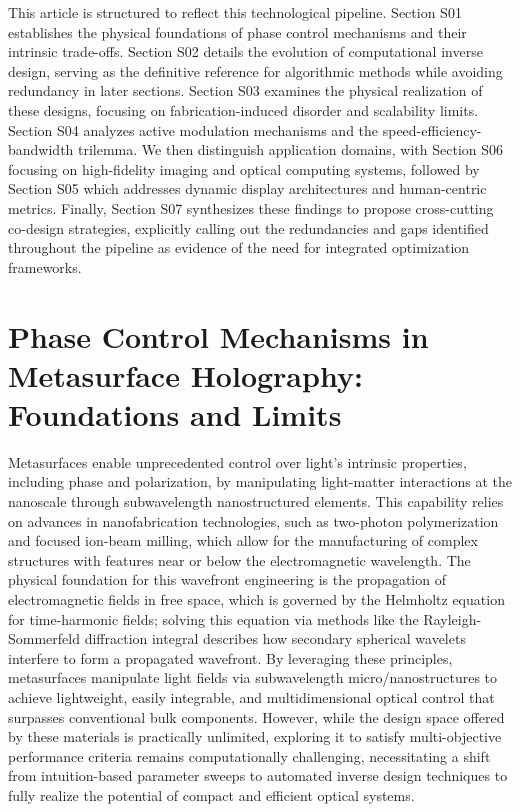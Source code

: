 This article is structured to reflect this technological pipeline. Section S01 establishes the physical foundations of phase control mechanisms and their intrinsic trade-offs. Section S02 details the evolution of computational inverse design, serving as the definitive reference for algorithmic methods while avoiding redundancy in later sections. Section S03 examines the physical realization of these designs, focusing on fabrication-induced disorder and scalability limits. Section S04 analyzes active modulation mechanisms and the speed-efficiency-bandwidth trilemma. We then distinguish application domains, with Section S06 focusing on high-fidelity imaging and optical computing systems, followed by Section S05 which addresses dynamic display architectures and human-centric metrics. Finally, Section S07 synthesizes these findings to propose cross-cutting co-design strategies, explicitly calling out the redundancies and gaps identified throughout the pipeline as evidence of the need for integrated optimization frameworks.

\section{Phase Control Mechanisms in Metasurface Holography: Foundations and Limits}\label{phase-control-mechanisms-in-metasurface-holography-foundations-and-limits}

Metasurfaces enable unprecedented control over light's intrinsic properties, including phase and polarization, by manipulating light-matter interactions at the nanoscale through subwavelength nanostructured elements. This capability relies on advances in nanofabrication technologies, such as two-photon polymerization and focused ion-beam milling, which allow for the manufacturing of complex structures with features near or below the electromagnetic wavelength. The physical foundation for this wavefront engineering is the propagation of electromagnetic fields in free space, which is governed by the Helmholtz equation for time-harmonic fields; solving this equation via methods like the Rayleigh-Sommerfeld diffraction integral describes how secondary spherical wavelets interfere to form a propagated wavefront. \citep{doi_10_21236_ada421453_63603a3f} \citep{doi_10_1364_ol_509688_f6e1ff85} By leveraging these principles, metasurfaces manipulate light fields via subwavelength micro/nanostructures to achieve lightweight, easily integrable, and multidimensional optical control that surpasses conventional bulk components. However, while the design space offered by these materials is practically unlimited, exploring it to satisfy multi-objective performance criteria remains computationally challenging, necessitating a shift from intuition-based parameter sweeps to automated inverse design techniques to fully realize the potential of compact and efficient optical systems. \citep{doi_10_1021_acsphotonics_3c00572_fda8f742} \citep{doi_10_1002_advs_202504634_52bafb6c} \citep{doi_10_1038_s41377_026_02272_y_42e58df2}


